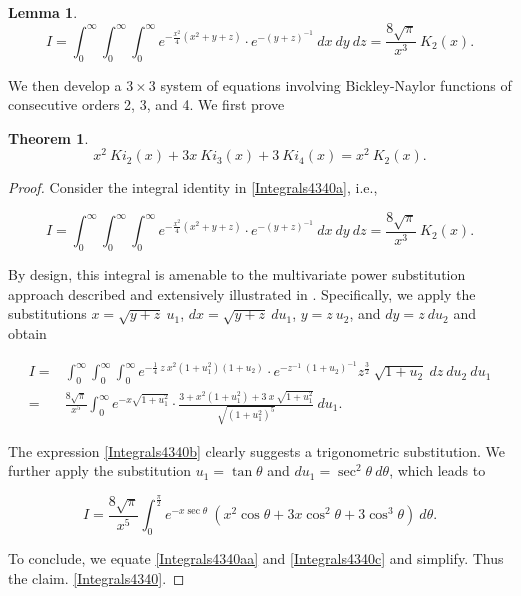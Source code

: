 \documentclass[pdflatex,sn-mathphys-num]{sn-jnl}%
\newtheorem{lemma}{Lemma}
\theoremstyle{thmstyleone}%
\newtheorem{theorem}{Theorem}%
\theoremstyle{thmstyletwo}%
\theoremstyle{thmstylethree}%
\begin{document}
\begin{lemma}

\begin{equation}
I
=
\int_0^\infty
\int_0^\infty
\int_0^\infty
e^{
-\frac{x^2}{4}
(x^2+y+z)
}\cdot
e^{-(y+z)^{-1}}\:
dx\:dy\:dz
=
\frac{8\sqrt{\pi}}{x^3}\:
K_2(x).
\label{Integrals4340a}
\end{equation}

\end{lemma}


We then develop a $3\times 3$ system of equations involving Bickley-Naylor functions of consecutive orders 2, 3, and 4. We first prove

\begin{theorem}

\begin{equation}
x^2\:Ki_2(x) + 3x\:Ki_3(x) + 3\:Ki_4(x) = x^2\:K_2(x).
\label{Integrals4340}
\end{equation}
    
\end{theorem}

\begin{proof}
Consider the integral identity in \eqref{Integrals4340a}, i.e.,

\begin{equation}
I
=
\int_0^\infty
\int_0^\infty
\int_0^\infty
e^{
-\frac{x^2}{4}
(x^2+y+z)
}\cdot
e^{-(y+z)^{-1}}\:
dx\:dy\:dz
=
\frac{8\sqrt{\pi}}{x^3}\:
K_2(x).
\label{Integrals4340aa}
\end{equation}

By design, this integral is amenable to the multivariate power substitution approach described and extensively illustrated in \cite{ Ruffa2022,Ruffa2024}. Specifically, we apply the substitutions $x=\sqrt{y+z}\:u_1$, $dx=\sqrt{y+z}\: du_1$, $y=z\:u_2$, and $dy=z\: du_2$ and obtain

\begin{equation}
\begin{split}
I = & \int_0^\infty \int_0^\infty \int_0^\infty e^{-\frac{1}{4}\:z\:x^2(1+u_1^2)(1+u_2)}\cdot
e^{-z^{-1}\:(1+u_2)^{-1} } z^{\frac{3}{2}}\: \sqrt{1+u_2}\: dz\:du_2\:du_1\\
= & \frac{8\sqrt{\pi}}{x^5}
\int_0^\infty
e^{-x\sqrt{1+u_1^2}}\cdot
\frac{ 3+x^2(1+u_1^2)+3\:x\:\sqrt{1+u_1^2}}{\sqrt{(1+u_1^2)^5}}\:du_1.
\label{Integrals4340b}
\end{split}
\end{equation}

The expression \eqref{Integrals4340b} clearly suggests a trigonometric substitution. We further apply the substitution $u_1=\tan\theta$ and $du_1=\sec^2\theta\:d\theta$, which leads to 

\begin{equation}
I
=
\frac{8\sqrt{\pi}}{x^5}
\int_0^\frac{\pi}{2}
e^{-x\sec\theta}\:
(x^2\cos\theta+3x\cos^2\theta+3\cos^3\theta)\:
d\theta.
\label{Integrals4340c}
\end{equation}

To conclude, we equate \eqref{Integrals4340aa} and \eqref{Integrals4340c} and simplify. Thus the claim. \eqref{Integrals4340}.
\end{proof}
\end{document}
